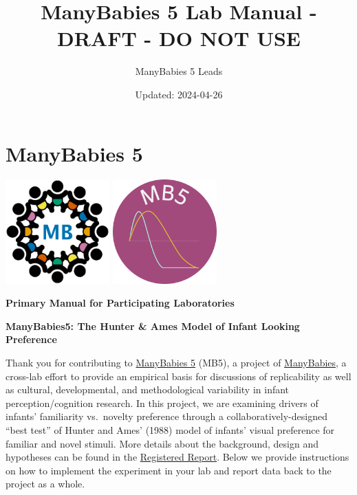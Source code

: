 \documentclass[
]{book}
\title{ManyBabies 5 Lab Manual - DRAFT - DO NOT USE}
\author{ManyBabies 5 Leads}
\date{Updated: 2024-04-26}
\theoremstyle{definition}
\theoremstyle{definition}
\theoremstyle{definition}
\theoremstyle{definition}
\theoremstyle{remark}
\begin{document}
\maketitle

{
\setcounter{tocdepth}{1}
\tableofcontents
}
\hypertarget{manybabies-5}{%
\chapter{ManyBabies 5}\label{manybabies-5}}

\includegraphics[width=0.3\textwidth,height=\textheight]{images/mb-logo.png} \includegraphics[width=0.3\textwidth,height=\textheight]{images/mb5-logo.png}

\textbf{Primary Manual for Participating Laboratories}

\textbf{ManyBabies5: The Hunter \& Ames Model of Infant Looking Preference}

Thank you for contributing to \href{https://manybabies.org/MB5/}{ManyBabies 5} (MB5), a project of \href{https://manybabies.org/}{ManyBabies}, a cross-lab effort to provide an empirical basis for discussions of replicability as well as cultural, developmental, and methodological variability in infant perception/cognition research. In this project, we are examining drivers of infants' familiarity vs.~novelty preference through a collaboratively-designed ``best test'' of Hunter and Ames' (1988) model of infants' visual preference for familiar and novel stimuli. More details about the background, design and hypotheses can be found in the \href{https://osf.io/preprints/psyarxiv/ck3vd}{Registered Report}. Below we provide instructions on how to implement the experiment in your lab and report data back to the project as a whole.
\end{document}
